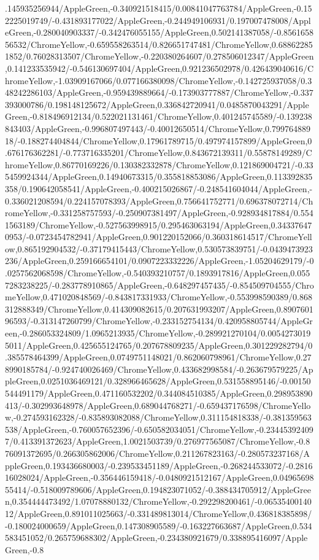 {\begin{tikzternal}
.145935256944/AppleGreen,-0.340921518415/0.00841047763784/AppleGreen,-0.152225019749/-0.431893177022/AppleGreen,-0.244949106931/0.197007478008/AppleGreen,-0.280040903337/-0.342476055155/AppleGreen,0.502141387058/-0.856165856532/ChromeYellow,-0.659558263514/0.826651747481/ChromeYellow,0.688622851852/0.76028313507/ChromeYellow,-0.220380264607/0.278506012347/AppleGreen,0.141233535942/-0.546130697404/AppleGreen,0.921236502978/0.426439040616/ChromeYellow,-1.03909167066/0.077166380098/ChromeYellow,-0.142725937058/0.348242286103/AppleGreen,-0.959439889664/-0.173903777887/ChromeYellow,-0.337393000786/0.198148125672/AppleGreen,0.336842720941/0.0485870043291/AppleGreen,-0.818496912134/0.522021131461/ChromeYellow,0.401245745589/-0.139238843403/AppleGreen,-0.996807497443/-0.40012650514/ChromeYellow,0.79976488918/-0.188274404844/ChromeYellow,0.17961789715/0.497974157899/AppleGreen,0.676176362281/-0.773716335201/ChromeYellow,0.843672139311/0.55878149289/ChromeYellow,0.86770169226/0.130382332878/ChromeYellow,0.121869004721/-0.335459924344/AppleGreen,0.14940673315/0.355818853086/AppleGreen,0.113392835358/0.190642058541/AppleGreen,-0.400215026867/-0.248541604044/AppleGreen,-0.336021208594/0.224157078393/AppleGreen,0.756641752771/0.696378072714/ChromeYellow,-0.331258757593/-0.250907381497/AppleGreen,-0.928934817884/0.5541563189/ChromeYellow,-0.527563998915/0.295463063194/AppleGreen,0.343376470953/-0.0723454782941/AppleGreen,0.901220152066/0.360318614517/ChromeYellow,0.865192904532/-0.37179415443/ChromeYellow,0.530573839751/-0.0439473923236/AppleGreen,0.259166654101/0.0907223332226/AppleGreen,-1.05204629179/-0.0257562068598/ChromeYellow,-0.540393210757/0.1893917816/AppleGreen,0.0557283238225/-0.283778910865/AppleGreen,-0.648297457435/-0.854509704555/ChromeYellow,0.471020848569/-0.843817331933/ChromeYellow,-0.553998590389/0.868312888349/ChromeYellow,0.414309082615/0.207631993207/AppleGreen,0.890760196593/-0.313147260799/ChromeYellow,-0.233152754134/0.420958805744/AppleGreen,-0.286053324809/1.0965213935/ChromeYellow,-0.289921270104/0.00542730195011/AppleGreen,0.425655124765/0.207678809235/AppleGreen,0.301229282794/0.385578464399/AppleGreen,0.0749751148021/0.862060798961/ChromeYellow,0.278990185784/-0.924740026469/ChromeYellow,0.433682998584/-0.263679579225/AppleGreen,0.0251036469121/0.328966465628/AppleGreen,0.531558895146/-0.00150544491179/AppleGreen,0.471160532202/0.344084510385/AppleGreen,0.298953890413/-0.302993648978/AppleGreen,0.689044768271/-0.659437176598/ChromeYellow,-0.274593162328/-0.835893082088/ChromeYellow,0.311154818338/-0.381359563538/AppleGreen,-0.760057652396/-0.650582034051/ChromeYellow,-0.234453924097/0.413391372623/AppleGreen,1.0021503739/0.276977565087/ChromeYellow,-0.876091372695/0.266305862006/ChromeYellow,0.211267823163/-0.280573237168/AppleGreen,0.193436680003/-0.239533451189/AppleGreen,-0.268244533072/-0.281616028024/AppleGreen,-0.356446159418/-0.0480921512167/AppleGreen,0.0496569855414/-0.518009789606/AppleGreen,0.194823071052/-0.388434705912/AppleGreen,0.354444473492/1.07078880132/ChromeYellow,-0.292298200461/-0.0653540014012/AppleGreen,0.891011025663/-0.331489813014/ChromeYellow,0.436818385898/-0.180024000659/AppleGreen,0.147308905589/-0.163227663687/AppleGreen,0.534583451052/0.265759688302/AppleGreen,-0.234380921679/0.338895416097/AppleGreen,-0.8
\end{tikzternal}}
